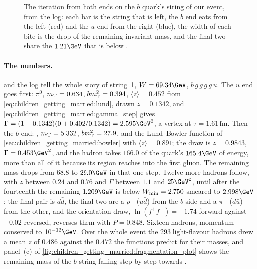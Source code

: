 \begin{figure}[htbp]\centering
\resizebox{\textwidth}{!}{}
\caption[The iteration from both ends on the $b$ quark's string]{The
iteration from both ends on the $b$ quark's string of our event, from the
 log: each bar is the string that is left, the $b$ end eats from
the left (red) and the $\bar u$ end from the right (blue), the width of each
bite is the drop of the remaining invariant mass, and the final two share
the $1.21\GeV$ that is below \Wmin.}
\label{fig:children_getting_married:iteration_sketch}
\end{figure}

\paragraph{The numbers.} 
and the log tell the whole story of string~1, $W=69.34\GeV$,
$b\,g\,g\,g\,g\,\bar u$. The $\bar u$ end goes first: $\pi^0$, $m_{\mathrm{T}}=0.634$,
$bm_{\mathrm{T}}^2=0.394$, $\langle z\rangle=0.452$ from
\cref{eq:children_getting_married:lund}, drawn $z=0.1342$, and
\cref{eq:children_getting_married:gamma_step} gives
$\Gamma=(1-0.1342)(0+0.402/0.1342)=2.595\GeV^2$, a vertex at
$\tau=1.61\,\mathrm{fm}$. Then the $b$ end: \Bstarbar, $m_{\mathrm{T}}=5.332$,
$bm_{\mathrm{T}}^2=27.9$, and the Lund--Bowler function of
\cref{sec:children_getting_married:bowler} with $\langle z\rangle=0.891$;
the draw is $z=0.9843$, $\Gamma=0.453\GeV^2$, and the hadron takes
$166.0$ of the quark's $165.4\GeV$ of energy, more than all of it because
its region reaches into the first gluon. The remaining mass drops from
$68.8$ to $29.0\GeV$ in that one step. Twelve more hadrons follow, with
$z$ between $0.24$ and $0.76$ and $\Gamma$ between $1.1$ and $25\GeV^2$,
until after the fourteenth the remaining $1.209\GeV$ is below
$W_{\min}=2.750$ smeared to $2.998\GeV$; the final pair is $d\bar d$, the
final two are a $\rho^+$ ($u\bar d$) from the $b$ side and a $\pi^-$ ($d\bar u$)
from the other,
and the orientation draw, $\ln(f^+f^-)=-1.74$ forward against $-0.02$
reversed, reverses them with $P=0.848$. Sixteen hadrons, momentum
conserved to $10^{-12}\GeV$. Over the whole event the 293 light-flavour
hadrons drew a mean $z$ of $0.486$ against the $0.472$ the functions
predict for their masses, and panel~(c) of
\cref{fig:children_getting_married:fragmentation_plot} shows the remaining
mass of the $b$ string falling step by step towards \Wmin.

